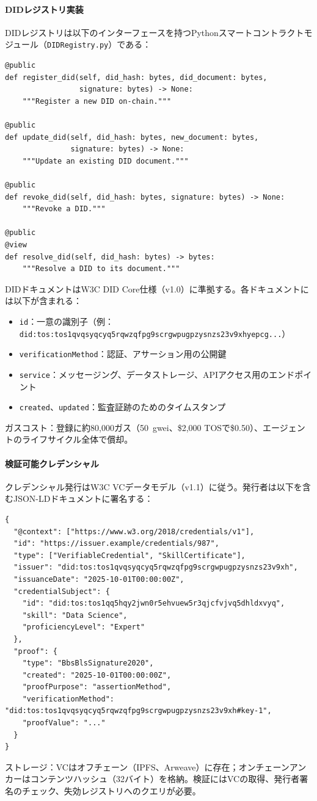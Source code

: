 \documentclass[11pt]{article}
\begin{document}
\paragraph{DIDレジストリ実装} DIDレジストリは以下のインターフェースを持つPythonスマートコントラクトモジュール（\texttt{DIDRegistry.py}）である：
\begin{verbatim}
@public
def register_did(self, did_hash: bytes, did_document: bytes,
                 signature: bytes) -> None:
    """Register a new DID on-chain."""

@public
def update_did(self, did_hash: bytes, new_document: bytes,
               signature: bytes) -> None:
    """Update an existing DID document."""

@public
def revoke_did(self, did_hash: bytes, signature: bytes) -> None:
    """Revoke a DID."""

@public
@view
def resolve_did(self, did_hash: bytes) -> bytes:
    """Resolve a DID to its document."""
\end{verbatim}
DIDドキュメントはW3C DID Core仕様（v1.0）に準拠する。各ドキュメントには以下が含まれる：
\begin{itemize}[noitemsep]
  \item \texttt{id}：一意の識別子（例：\texttt{did:tos:tos1qvqsyqcyq5rqwzqfpg9scrgwpugpzysnzs23v9xhyepcg...}）
  \item \texttt{verificationMethod}：認証、アサーション用の公開鍵
  \item \texttt{service}：メッセージング、データストレージ、APIアクセス用のエンドポイント
  \item \texttt{created}、\texttt{updated}：監査証跡のためのタイムスタンプ
\end{itemize}
ガスコスト：登録に約80,000ガス（50~gwei、\$2,000 TOSで\$0.50）、エージェントのライフサイクル全体で償却。

\paragraph{検証可能クレデンシャル} クレデンシャル発行はW3C VCデータモデル（v1.1）に従う。発行者は以下を含むJSON-LDドキュメントに署名する：
\begin{verbatim}
{
  "@context": ["https://www.w3.org/2018/credentials/v1"],
  "id": "https://issuer.example/credentials/987",
  "type": ["VerifiableCredential", "SkillCertificate"],
  "issuer": "did:tos:tos1qvqsyqcyq5rqwzqfpg9scrgwpugpzysnzs23v9xh",
  "issuanceDate": "2025-10-01T00:00:00Z",
  "credentialSubject": {
    "id": "did:tos:tos1qq5hqy2jwn0r5ehvuew5r3qjcfvjvq5dhldxvyq",
    "skill": "Data Science",
    "proficiencyLevel": "Expert"
  },
  "proof": {
    "type": "BbsBlsSignature2020",
    "created": "2025-10-01T00:00:00Z",
    "proofPurpose": "assertionMethod",
    "verificationMethod": "did:tos:tos1qvqsyqcyq5rqwzqfpg9scrgwpugpzysnzs23v9xh#key-1",
    "proofValue": "..."
  }
}
\end{verbatim}
ストレージ：VCはオフチェーン（IPFS、Arweave）に存在；オンチェーンアンカーはコンテンツハッシュ（32バイト）を格納。検証にはVCの取得、発行者署名のチェック、失効レジストリへのクエリが必要。
\end{document}

